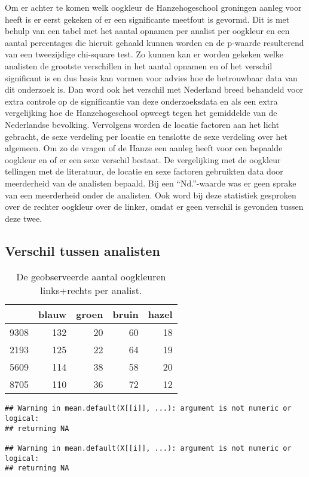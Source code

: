 \documentclass[
]{article}
\begin{document}
Om er achter te komen welk oogkleur de Hanzehogeschool groningen aanleg
voor heeft is er eerst gekeken of er een significante meetfout is
gevormd. Dit is met behulp van een tabel met het aantal opnamen per
analist per oogkleur en een aantal percentages die hieruit gehaald
kunnen worden en de p-waarde resulterend van een tweezijdige chi-square
test. Zo kunnen kan er worden gekeken welke analisten de grootste
verschillen in het aantal opnamen en of het verschil significant is en
dus basis kan vormen voor advies hoe de betrouwbaar data van dit
onderzoek is. Dan word ook het verschil met Nederland breed behandeld
voor extra controle op de significantie van deze onderzoeksdata en als
een extra vergelijking hoe de Hanzehogeschool opweegt tegen het
gemiddelde van de Nederlandse bevolking. Vervolgens worden de locatie
factoren aan het licht gebracht, de sexe verdeling per locatie en
tenslotte de sexe verdeling over het algemeen. Om zo de vragen of de
Hanze een aanleg heeft voor een bepaalde oogkleur en of er een sexe
verschil bestaat. De vergelijking met de oogkleur tellingen met de
literatuur, de locatie en sexe factoren gebruikten data door meerderheid
van de analisten bepaald. Bij een ``Nd.''-waarde was er geen sprake van
een meerderheid onder de analisten. Ook word bij deze statistiek
gesproken over de rechter oogkleur over de linker, omdat er geen
verschil is gevonden tussen deze twee.

\hypertarget{verschil-tussen-analisten}{%
\subsection{Verschil tussen analisten}\label{verschil-tussen-analisten}}

\begin{longtable}[t]{l|r|r|r|r}
\caption{\label{tab:analist-oogkleur-chi-square}De geobserveerde aantal oogkleuren links+rechts per analist.}\\
\hline
  & blauw & groen & bruin & hazel\\
\hline
9308 & 132 & 20 & 60 & 18\\
\hline
2193 & 125 & 22 & 64 & 19\\
\hline
5609 & 114 & 38 & 58 & 20\\
\hline
8705 & 110 & 36 & 72 & 12\\
\hline
\end{longtable}

\begin{verbatim}
## Warning in mean.default(X[[i]], ...): argument is not numeric or logical:
## returning NA

## Warning in mean.default(X[[i]], ...): argument is not numeric or logical:
## returning NA
\end{verbatim}
\end{document}
